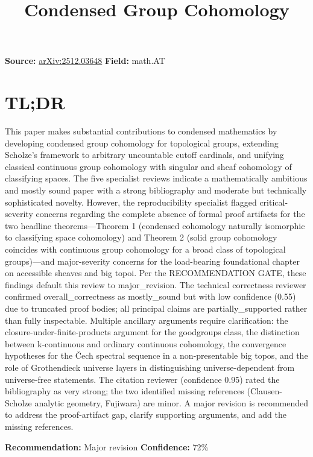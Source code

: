 \documentclass[11pt]{article}
\title{Condensed Group Cohomology}
\date{}
\begin{document}
\maketitle

\noindent\textbf{Source:} \href{https://arxiv.org/abs/2512.03648}{arXiv:2512.03648} \quad \textbf{Field:} math.AT\\

\section*{TL;DR}
This paper makes substantial contributions to condensed mathematics by developing condensed group cohomology for topological groups, extending Scholze's framework to arbitrary uncountable cutoff cardinals, and unifying classical continuous group cohomology with singular and sheaf cohomology of classifying spaces. The five specialist reviews indicate a mathematically ambitious and mostly sound paper with a strong bibliography and moderate but technically sophisticated novelty. However, the reproducibility specialist flagged critical-severity concerns regarding the complete absence of formal proof artifacts for the two headline theorems—Theorem 1 (condensed cohomology naturally isomorphic to classifying space cohomology) and Theorem 2 (solid group cohomology coincides with continuous group cohomology for a broad class of topological groups)—and major-severity concerns for the load-bearing foundational chapter on accessible sheaves and big topoi. Per the RECOMMENDATION GATE, these findings default this review to major\_revision. The technical correctness reviewer confirmed overall\_correctness as mostly\_sound but with low confidence (0.55) due to truncated proof bodies; all principal claims are partially\_supported rather than fully inspectable. Multiple ancillary arguments require clarification: the closure-under-finite-products argument for the goodgroups class, the distinction between k-continuous and ordinary continuous cohomology, the convergence hypotheses for the Čech spectral sequence in a non-presentable big topos, and the role of Grothendieck universe layers in distinguishing universe-dependent from universe-free statements. The citation reviewer (confidence 0.95) rated the bibliography as very strong; the two identified missing references (Clausen-Scholze analytic geometry, Fujiwara) are minor. A major revision is recommended to address the proof-artifact gap, clarify supporting arguments, and add the missing references.

\textbf{Recommendation:} Major revision \quad \textbf{Confidence:} 72\%\\
\end{document}
